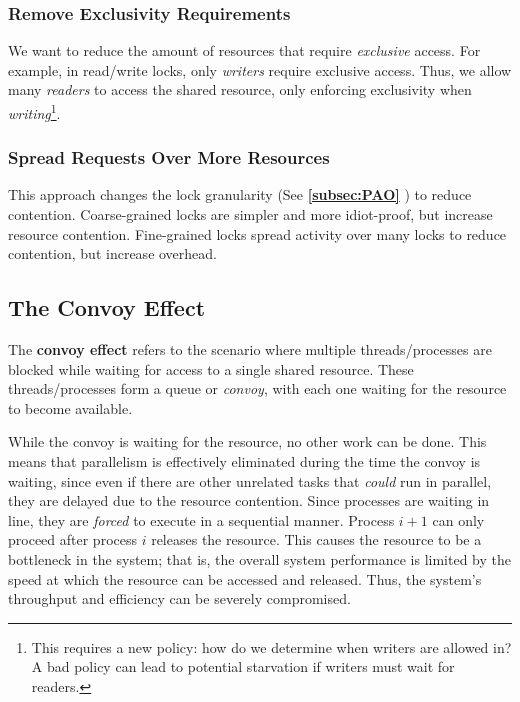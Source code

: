 \documentclass{report}
\newcommand{\definitionBegin}[1]{\begin{tcolorbox}[title={Definition: #1}]}
\newcommand{\definitionEnd}{\end{tcolorbox}}
\newcommand{\exampleBegin}[1]{\begin{tcolorbox}[colback=blue!5!white,colframe=black!75!blue,title={Example:
      #1}]}
\newcommand{\exampleEnd}{\end{tcolorbox}}
\newcommand{\refto}[2]{\textbf{\ref{#1:#2} \nameref{#1:#2}}}
\begin{document}
\subsubsection{Remove Exclusivity Requirements}
We want to reduce the amount of resources that require \textit{exclusive} access. For example,
in read/write locks, only \textit{writers} require exclusive access. Thus, we allow many
\textit{readers} to access the shared resource, only enforcing exclusivity when
\textit{writing}\footnote{This requires a new policy: how do we determine when writers are allowed
  in? A bad policy can lead to potential starvation if writers must wait for readers.}.


\subsubsection{Spread Requests Over More Resources}
This approach changes the lock granularity (See \refto{subsec}{PAO}) to reduce
contention. Coarse-grained locks are simpler and more idiot-proof, but increase resource
contention. Fine-grained locks spread activity over many locks to reduce contention, but increase
overhead. 


\subsection{The Convoy Effect}
\label{subsec:TCE}
\definitionBegin{Convoy Effect}
The \textbf{convoy effect} refers to the scenario where multiple threads/processes are blocked while
waiting for access to a single shared resource. These threads/processes form a queue or
\textit{convoy}, with each one waiting for the resource to become available.
\definitionEnd

While the convoy is waiting for the resource, no other work can be done. This means that parallelism
is effectively eliminated during the time the convoy is waiting, since even if there are other
unrelated tasks that \textit{could} run in parallel, they are delayed due to the resource
contention. Since processes are waiting in line, they are \textit{forced} to execute in a sequential
manner. Process $i + 1$ can only proceed after process $i$ releases the resource. This causes the
resource to be a bottleneck in the system; that is, the overall system performance is limited by the
speed at which the resource can be accessed and released. Thus, the system's throughput and
efficiency can be severely compromised.



\end{document}
